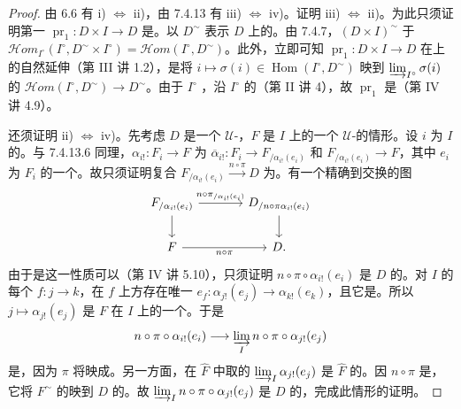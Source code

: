 \begin{proof}
由 6.6 有 i) $\Leftrightarrow$ ii)，由 7.4.13 有 iii) $\Leftrightarrow$ iv)。证明 iii) $\Leftrightarrow$ ii)。为此只须证明第一 $\operatorname{pr}_1:D\times I\to D$ 是。以 $D^\sim$ 表示 $D$ 上的。由 7.4.7，$(D\times I)^\sim$ 于 $\mathscr{H}\!om_{I^\circ}(I^\circ,D^\sim\times I^\circ)=\mathscr{H}\!om(I^\circ,D^\sim)$。此外，立即可知 $\operatorname{pr}_1:D\times I\to D$ 在上的自然延伸（第 III 讲 1.2），是将 $i\mapsto\sigma(i)\in\operatorname{Hom}(I^\circ,D^\sim)$ 映到 $\varinjlim_{I^\circ}\sigma(i)$ 的 $\mathscr{H}\!om(I^\circ,D^\sim)\to D^\sim$。由于 $I^\circ$ ，沿 $I^\circ$ 的（第 II 讲 4），故 $\operatorname{pr}_1$ 是（第 IV 讲 4.9）。

还须证明 ii) $\Leftrightarrow$ iv)。先考虑 $D$ 是一个 $\mathcal U$-，$F$ 是 $I$ 上的一个 $\mathcal U$-的情形。设 $i$ 为 $I$ 的。与 7.4.13.6 同理，$\alpha_{i!}:F_i\to F$ 为 $\overline\alpha_{i!}:F_i\to F_{/\alpha_{i!}(e_i)}$ 和 $F_{/\alpha_{i!}(e_i)}\to F$，其中 $e_i$ 为 $F_i$ 的一个。故只须证明复合 $F_{/\alpha_{i!}(e_i)}\xrightarrow{n\circ\pi}D$ 为。有一个精确到交换的图
\[\begin{tikzcd}[column sep=large]
F_{/\alpha_{i!}(e_i)}\arrow[r,"n\circ\pi_{/\alpha_{i!}(e_i)}"]\arrow[d]&D_{/n\circ\pi\alpha_{i!}(e_i)}\arrow[d]\\
F\arrow[r,"n\circ\pi"']&D.
\end{tikzcd}\]
由于是这一性质可以（第 IV 讲 5.10），只须证明 $n\circ\pi\circ\alpha_{i!}(e_i)$ 是 $D$ 的。对 $I$ 的每个 $f:j\to k$，在 $f$ 上方存在唯一 $e_f:\alpha_{j!}(e_j)\to\alpha_{k!}(e_k)$，且它是。所以 $j\mapsto\alpha_{j!}(e_j)$ 是 $F$ 在 $I$ 上的一个。于是
\[n\circ\pi\circ\alpha_{i!}(e_i)\longrightarrow\varinjlim_I n\circ\pi\circ\alpha_{j!}(e_j)\]
是，因为 $\pi$ 将映成。另一方面，在 $\widehat F$ 中取的 $\varinjlim_I\alpha_{j!}(e_j)$ 是 $\widehat F$ 的。因 $n\circ\pi$ 是，它将 $F^\sim$ 的映到 $D$ 的。故 $\varinjlim_I n\circ\pi\circ\alpha_{j!}(e_j)$ 是 $D$ 的，完成此情形的证明。


\end{proof}
